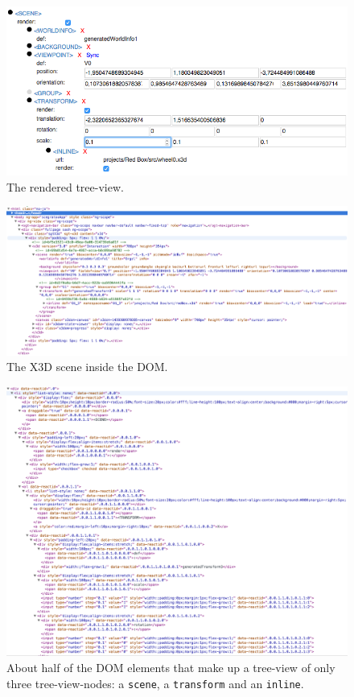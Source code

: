 \begin{figure}
  \centering
  \includegraphics[width=\textwidth]{../assets/treeview.png}
  \caption{The rendered tree-view.}
  \label{fig:tree-view}
\end{figure}

\begin{figure}
  \centering
  \includegraphics[width=\textwidth]{../assets/x3dom-dom.png}
  \caption{The \gls{X3D} scene inside the \gls{DOM}.}
  \label{fig:x3dom-dom}
\end{figure}

\begin{figure}
  \centering
  \includegraphics[width=\textwidth]{../assets/treeview-dom.png}
  \caption{About half of the \gls{DOM} elements that make up a tree-view of only three tree-view-nodes: a \texttt{scene}, a \texttt{transform} and an \texttt{inline}.}
  \label{fig:treeview-dom}
\end{figure}

